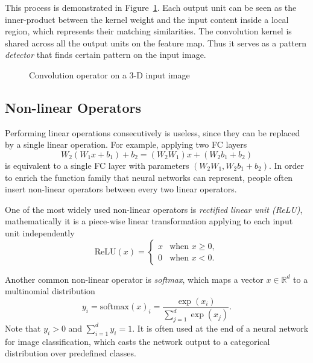 This process is demonstrated in Figure~\ref{fig:dl-conv}. Each output unit can be seen as the inner-product between the kernel weight and the input content inside a local region, which represents their matching similarities. The convolution kernel is shared across all the output units on the feature map. Thus it serves as a pattern \emph{detector} that finds certain pattern on the input image.
\begin{figure}[t]
\begin{center}
\fbox{\rule{0pt}{2in} \rule{0.9\linewidth}{0pt}}
\caption{Convolution operator on a 3-D input image}
\label{fig:dl-conv}
\end{center}
\end{figure}


\subsection{Non-linear Operators} %
\label{sub:dl-nonlinops}
Performing linear operations consecutively is useless, since they can be replaced by a single linear operation. For example, applying two FC layers
\begin{equation}
  W_2(W_1x+b_1)+b_2 = (W_2W_1)x +(W_2b_1+b_2)
\end{equation}
is equivalent to a single FC layer with parameters $(W_2W_1, W_2b_1+b_2)$. In order to enrich the function family that neural networks can represent, people often insert non-linear operators between every two linear operators.

One of the most widely used non-linear operators is \emph{rectified linear unit (ReLU)}, mathematically it is a piece-wise linear transformation applying to each input unit independently
\begin{equation}
  \mathrm{ReLU}(x) = \begin{cases}
    x & \text{when }x \ge 0,\\
    0 & \text{when }x < 0.
  \end{cases}
\end{equation}

Another common non-linear operator is \emph{softmax}, which maps a vector $x\in\mathbb{R}^d$ to a multinomial distribution
\begin{equation}
  y_i=\mathrm{softmax}(x)_i=\frac{\exp(x_i)}{\sum_{j=1}^d \exp(x_j)}.
\end{equation}
Note that $y_i > 0$ and $\sum_{i=1}^d y_i = 1$. It is often used at the end of a neural network for image classification, which casts the network output to a categorical distribution over predefined classes.

